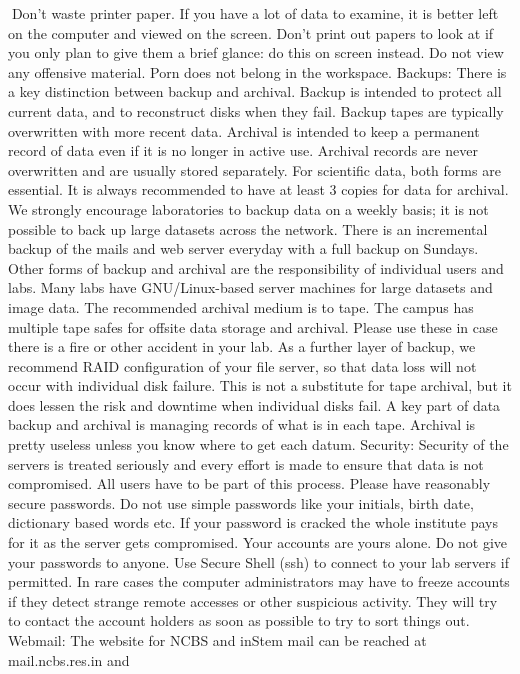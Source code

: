 \documentclass[a4paper,10pt]{article}
\begin{document}
Don't waste printer paper. If you have a lot of data to examine, it is better left on the
computer and viewed on the screen. Don’t print out papers to look at if you only plan to give
them a brief glance: do this on screen instead.
Do not view any offensive material. Porn does not belong in the workspace.
Backups: There is a key distinction between backup and archival. Backup is intended to
protect all current data, and to reconstruct disks when they fail. Backup tapes are typically
overwritten with more recent data. Archival is intended to keep a permanent record of data
even if it is no longer in active use. Archival records are never overwritten and are usually
stored separately. For scientific data, both forms are essential. It is always recommended to
have at least 3 copies for data for archival. We strongly encourage laboratories to backup
data on a weekly basis; it is not possible to back up large datasets across the network. There
is an incremental backup of the mails and web server everyday with a full backup on
Sundays. Other forms of backup and archival are the responsibility of individual users and
labs. Many labs have GNU/Linux-based server machines for large datasets and image data.
The recommended archival medium is to tape. The campus has multiple tape safes for
offsite data storage and archival. Please use these in case there is a fire or other accident in
your lab. As a further layer of backup, we recommend RAID configuration of your file
server, so that data loss will not occur with individual disk failure. This is not a substitute for
tape archival, but it does lessen the risk and downtime when individual disks fail. A key part
of data backup and archival is managing records of what is in each tape. Archival is pretty
useless unless you know where to get each datum.
Security: Security of the servers is treated seriously and every effort is made to ensure that
data is not compromised. All users have to be part of this process. Please have reasonably
secure passwords. Do not use simple passwords like your initials, birth date, dictionary
based words etc. If your password is cracked the whole institute pays for it as the server gets
compromised. Your accounts are yours alone. Do not give your passwords to anyone. Use
Secure Shell (ssh) to connect to your lab servers if permitted. In rare cases the computer
administrators may have to freeze accounts if they detect strange remote accesses or other
suspicious activity. They will try to contact the account holders as soon as possible to try to
sort things out.
Webmail: The website for NCBS and inStem mail can be reached at mail.ncbs.res.in and
\end{document}
